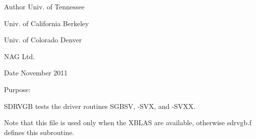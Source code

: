 \begin{DoxyAuthor}{Author}
Univ. of Tennessee 

Univ. of California Berkeley 

Univ. of Colorado Denver 

N\+A\+G Ltd. 
\end{DoxyAuthor}
\begin{DoxyDate}{Date}
November 2011
\end{DoxyDate}
\begin{DoxyParagraph}{Purpose\+: }
\begin{DoxyVerb} SDRVGB tests the driver routines SGBSV, -SVX, and -SVXX.

 Note that this file is used only when the XBLAS are available,
 otherwise sdrvgb.f defines this subroutine.\end{DoxyVerb}
 
\end{DoxyParagraph}

